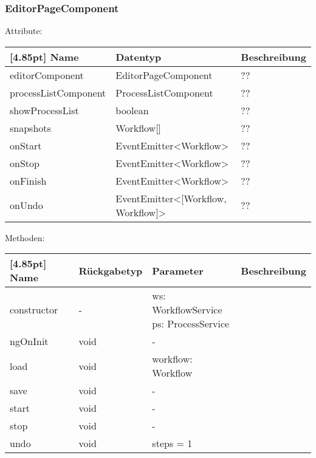         	\subsubsection{EditorPageComponent}
        	
        	    Attribute:
                \begin{center}
                	\renewcommand{\arraystretch}{1.5}
                    \setlength\tabcolsep{5pt}
                	\begin{tabularx}{\textwidth}{|l|l|X|}
                		\hline
                        \rowcolor[gray]{0.75}[4.85pt]            		
                        Name & Datentyp & Beschreibung \\ \hline
                        editorComponent  & EditorPageComponent & ?? \\ \hline
                        processListComponent  & ProcessListComponent & ?? \\ \hline
                        showProcessList  & boolean & ?? \\ \hline
                        snapshots  & Workflow[] & ?? \\ \hline
                        onStart  & EventEmitter<Workflow> & ?? \\ \hline
                        onStop  & EventEmitter<Workflow> & ?? \\ \hline
                        onFinish  & EventEmitter<Workflow> & ?? \\ \hline
                        onUndo  & EventEmitter<[Workflow, Workflow]> & ?? \\ \hline
                	\end{tabularx}
                \end{center}
                
                Methoden:
        		\begin{center}
                \setlength\tabcolsep{5pt}
                	\renewcommand{\arraystretch}{1.5}
                    	\begin{tabularx}{\textwidth}{|l|l|l|X|}
                    	\hline
                    	\rowcolor[gray]{0.75}[4.85pt]
                		Name & Rückgabetyp & Parameter & Beschreibung \\ \hline
                		constructor& - & \thead{ws: WorkflowService\\ps: ProcessService} & \\ \hline
                		ngOnInit & void &- & \\ \hline
                		load & void & workflow: Workflow & \\ \hline
                		save & void & - & \\ \hline
                		start & void & - & \\ \hline
                		stop & void & - & \\ \hline
                		undo & void & steps = 1 & \\ \hline
                        \end{tabularx}
        		\end{center}
        	
